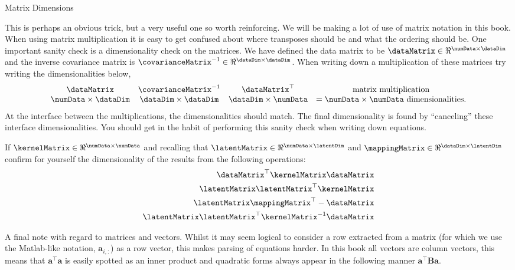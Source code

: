 \begin{tipfloat}
  \caption{Matrix Dimensions}\label{tip:matrixMultiplication}

  \boxfontsize This is perhaps an obvious trick, but a very useful one
  so worth reinforcing. We will be making a lot of use of matrix
  notation in this book. When using matrix multiplication it is easy to
  get confused about where transposes should be and what the ordering
  should be. One important sanity check is a dimensionality check on the
  matrices. We have defined the data matrix to be $\dataMatrix \in
  \Re^{\numData \times \dataDim}$ and the inverse covariance matrix is
  $\covarianceMatrix^{-1} \in \Re^{\dataDim\times \dataDim}$. When
  writing down a multiplication of these matrices try writing the
  dimensionalities below,
  \begin{align*}
    \begin{array}{cccc}
      \dataMatrix &  \covarianceMatrix^{-1} &\dataMatrix^\top & \text{matrix\ multiplication}\\
      \numData \times \dataDim & \dataDim \times \dataDim & \dataDim \times \numData & = \numData \times \numData\ \text{dimensionalities}.
    \end{array}
  \end{align*}
  At the interface between the multiplications, the dimensionalities
  should match. The final dimensionality is found by ``canceling''
  these interface dimensionalities. You should get in the habit of
  performing this sanity check when writing down equations.

  If $\kernelMatrix \in \Re^{\numData\times\numData}$ and recalling
  that $\latentMatrix \in \Re^{\numData\times\latentDim}$ and
  $\mappingMatrix \in \Re^{\dataDim\times \latentDim}$ confirm for
  yourself the dimensionality of the results from the following
  operations:
  \begin{align*}
    \dataMatrix^\top \kernelMatrix \dataMatrix \\
    \latentMatrix\latentMatrix^\top \kernelMatrix \\
    \latentMatrix\mappingMatrix^\top - \dataMatrix\\
    \latentMatrix\latentMatrix^\top\kernelMatrix^{-1}\dataMatrix
  \end{align*}

  A final note with regard to matrices and vectors. Whilst it may seem
  logical to consider a row extracted from a matrix (for which we use
  the Matlab-like notation, $\mathbf{a}_{i, :}$) as a row vector, this
  makes parsing of equations harder. In this book all vectors are
  column vectors, this means that $\mathbf{a}^\top\mathbf{a}$ is
  easily spotted as an inner product and quadratic forms always appear
  in the following manner $\mathbf{a}^\top\mathbf{B}\mathbf{a}$.
\end{tipfloat}


